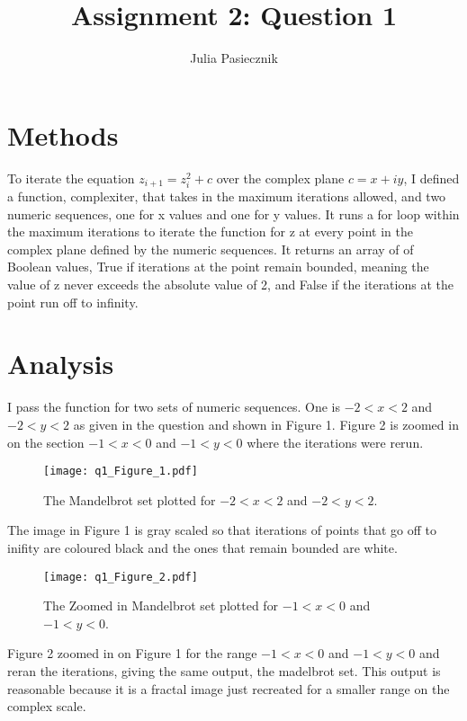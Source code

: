 \documentclass[apj]{emulateapj}
\begin{document}
\title{Assignment 2: Question 1}
 
\author{Julia Pasiecznik}


\section{Methods}
\label{sec:Methods}
To iterate the equation $z_{i + 1} = z_i^2 + c$ over the complex plane $c = x + iy$, I defined a function, complexiter, 
that takes in the maximum iterations allowed, and two numeric sequences, one for x values and one for y values. It runs
a for loop within the maximum iterations to iterate the function for z at every point in the complex plane defined by the
numeric sequences. It returns an array of of Boolean values, True if iterations at the point remain bounded, meaning the 
value of z never exceeds the absolute value of 2, and False if the iterations at the point run off to infinity.

\section{Analysis}
\label{sec:Analysis}
I pass the function for two sets of numeric sequences. One is $-2 < x < 2$ and $-2 < y < 2$ as given in the question and shown in Figure 1. Figure 2 is zoomed in on the section $-1 < x < 0$ and $-1 < y < 0$ where the iterations were rerun.

\begin{figure}
\texttt{[image: q1\_Figure\_1.pdf]}
\caption{The Mandelbrot set plotted for $-2 < x < 2$ and $-2 < y < 2$.}
\label{fig:Mandelbrot Set}
\end{figure}

The image in Figure 1 is gray scaled so that iterations of points that go off to inifity are coloured black and the ones that remain bounded are white.

\begin{figure}
\texttt{[image: q1\_Figure\_2.pdf]}
\caption{The Zoomed in Mandelbrot set plotted for $-1 < x < 0$ and $-1 < y < 0$.}
\label{fig: Zoomed in Mandelbrot Set}
\end{figure}

Figure 2 zoomed in on Figure 1 for the range $-1 < x < 0$ and $-1 < y < 0$ and reran the iterations, giving the same output, the madelbrot set. This output is reasonable because it is a fractal image just recreated for a smaller range on the complex scale.
\end{document}
